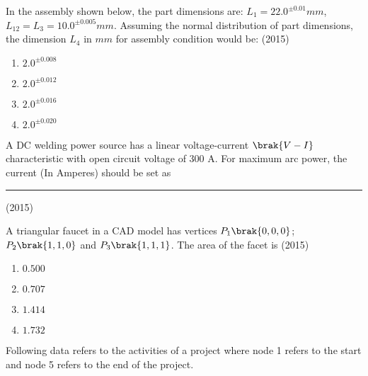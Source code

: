 \iffalse
	\chapter{2015}
	\author{AI24BTECH11003}
	\section{me}
\fi

    \item In the assembly shown below, the part dimensions are: $L_1=22.0^{\pm0.01}mm$, $L_12=L_3=10.0^{\pm0.005}mm$. Assuming the normal distribution of part dimensions, the dimension $L_4$ in $mm$ for assembly condition would be:
    \hfill{(2015)}

    
    

    \begin{multicols}{4}
        \begin{enumerate}
            \item $2.0^{\pm0.008}$
            \item $2.0^{\pm0.012}$
            \item $2.0^{\pm0.016}$
            \item $2.0^{\pm0.020}$
        \end{enumerate}
    \end{multicols}

    \item A DC welding power source has a linear voltage-current $\brak{V-I}$ characteristic with open circuit voltage of 300 A. For maximum arc power, the current (In Amperes) should be set as \rule{1cm}{0.15mm}
    \hfill{(2015)}

    \item A triangular faucet in a CAD model has vertices $P_1\brak{0,0,0}$; $P_2\brak{1,1,0}$ and $P_3\brak{1,1,1}$. The area of the facet is
    \hfill{(2015)}

    \begin{multicols}{4}
        \begin{enumerate}
            \item $0.500$
            \item $0.707$
            \item $1.414$
            \item $1.732$
        \end{enumerate}
    \end{multicols}


    \item Following data refers to the activities of a project where node 1 refers to the start and node 5 refers to the end of the project.

